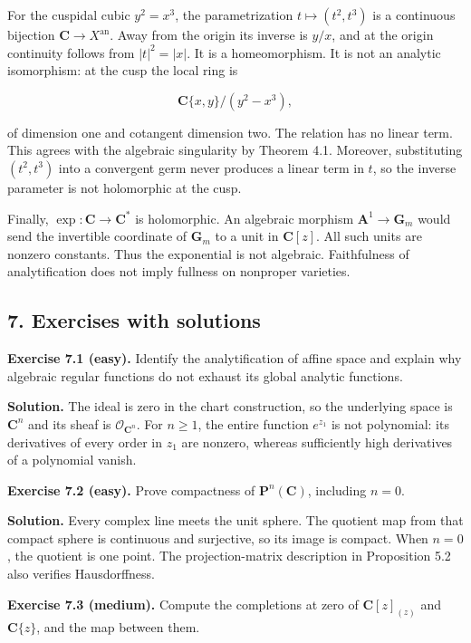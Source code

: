 \documentclass[11pt]{article}
\begin{document}
For the cuspidal cubic \(y^2=x^3\), the parametrization
\(t\mapsto(t^2,t^3)\) is a continuous bijection
\(\mathbf C\to X^{\mathrm{an}}\). Away from the origin its inverse is
\(y/x\), and at the origin continuity follows from \(|t|^2=|x|\). It is
a homeomorphism. It is not an analytic isomorphism: at the cusp the
local ring is

\[
\mathbf C\{x,y\}/(y^2-x^3),
\]

of dimension one and cotangent dimension two. The relation has no linear
term. This agrees with the algebraic singularity by Theorem 4.1.
Moreover, substituting \((t^2,t^3)\) into a convergent germ never
produces a linear term in \(t\), so the inverse parameter is not
holomorphic at the cusp.

Finally, \(\exp:\mathbf C\to\mathbf C^*\) is holomorphic. An algebraic
morphism \(\mathbf A^1\to\mathbf G_m\) would send the invertible
coordinate of \(\mathbf G_m\) to a unit in \(\mathbf C[z]\). All such
units are nonzero constants. Thus the exponential is not algebraic.
Faithfulness of analytification does not imply fullness on nonproper
varieties.

\subsection{7. Exercises with
solutions}\label{exercises-with-solutions-15}

\textbf{Exercise 7.1 (easy).} Identify the analytification of affine
space and explain why algebraic regular functions do not exhaust its
global analytic functions.

\textbf{Solution.} The ideal is zero in the chart construction, so the
underlying space is \(\mathbf C^n\) and its sheaf is
\(\mathcal O_{\mathbf C^n}\). For \(n\geq1\), the entire function
\(e^{z_1}\) is not polynomial: its derivatives of every order in \(z_1\)
are nonzero, whereas sufficiently high derivatives of a polynomial
vanish.

\textbf{Exercise 7.2 (easy).} Prove compactness of
\(\mathbf P^n(\mathbf C)\), including \(n=0\).

\textbf{Solution.} Every complex line meets the unit sphere. The
quotient map from that compact sphere is continuous and surjective, so
its image is compact. When \(n=0\), the quotient is one point. The
projection-matrix description in Proposition 5.2 also verifies
Hausdorffness.

\textbf{Exercise 7.3 (medium).} Compute the completions at zero of
\(\mathbf C[z]_{(z)}\) and \(\mathbf C\{z\}\), and the map between them.
\end{document}
